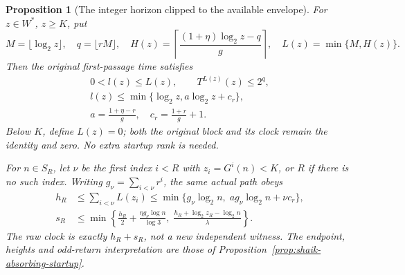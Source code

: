 \documentclass[11pt]{article}
\newtheorem{proposition}{Proposition}
\theoremstyle{remark}\newtheorem{remark}[proposition]{Remark}
\begin{document}
\begin{proposition}[The integer horizon clipped to the available envelope]
\label{prop:shaik-clipped-horizon}
For \(z\in W^*\), \(z\ge K\), put
\[
 M=\lfloor\log_2 z\rfloor,\quad q=\lfloor rM\rfloor,\quad
 H(z)=\left\lceil\frac{(1+\eta)\log_2z-q}{g}\right\rceil,\quad
 L(z)=\min\{M,H(z)\}.
\]
Then the original first-passage time satisfies
\begin{equation}\label{eq:shaik-clipped-block}
 \begin{gathered}
 0<l(z)\le L(z),\qquad T^{L(z)}(z)\le 2^q,\\
 l(z)\le \min\{\log_2z,a\log_2z+c_r\},\\
 a=\frac{1+\eta-r}{g},\quad c_r=\frac{1+r}{g}+1 .
 \end{gathered}
\end{equation}
Below \(K\), define \(L(z)=0\); both the original block and its clock
remain the identity and zero. No extra startup rank is needed.

For \(n\in S_R\), let \(\nu\) be the first index \(i<R\) with
\(z_i=G^i(n)<K\), or \(R\) if there is no such index.
Writing \(g_\nu=\sum_{i<\nu}r^i\), the same actual path obeys
\begin{align}
 h_R&\le\sum_{i<\nu}L(z_i)
       \le\min\{g_\nu\log_2 n,\;a g_\nu\log_2 n+\nu c_r\},
       \label{eq:shaik-clipped-sum}\\
 s_R&\le\min\left\{\frac{h_R}{2}
                +\frac{\eta g_\nu\log n}{\log3},\;
              \frac{h_R+\log_2z_R-\log_2n}{\lambda}\right\}.
       \label{eq:shaik-clipped-odd}
\end{align}
The raw clock is exactly \(h_R+s_R\), not a new independent witness.
The endpoint, heights and odd-return interpretation are those of
Proposition~\ref{prop:shaik-absorbing-startup}.
\end{proposition}
\end{document}
